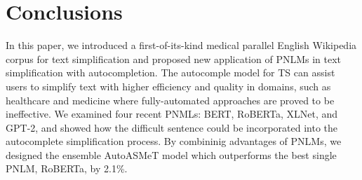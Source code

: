 \documentclass[11pt]{article}
\begin{document}
\section{Conclusions}

In this paper, we introduced a first-of-its-kind medical parallel English Wikipedia corpus for text simplification and proposed new application of PNLMs in text simplification with autocompletion. The autocomple model for TS can assist users to simplify text with higher efficiency and quality in domains, such as healthcare and medicine where fully-automated approaches are proved to be ineffective. We examined four recent PNMLs: BERT, RoBERTa, XLNet, and GPT-2, and showed how the difficult sentence could be incorporated into the autocomplete simplification process. By combininig advantages of PNLMs, we designed the ensemble AutoASMeT model which outperforms the best single PNLM, RoBERTa, by 2.1\%.











\end{document}
